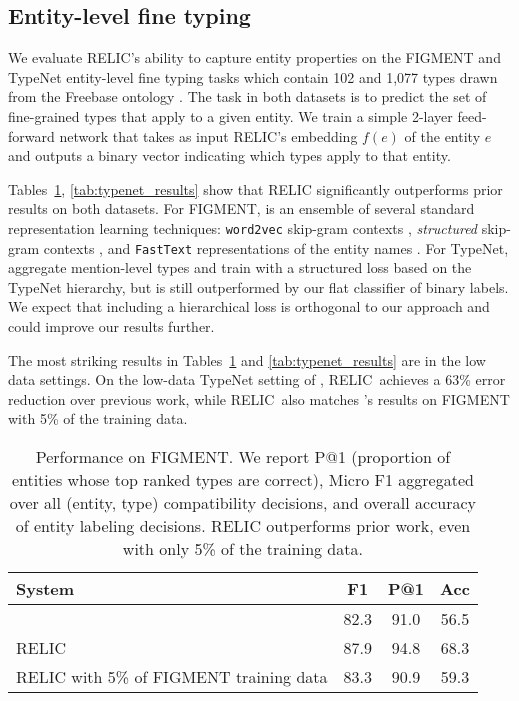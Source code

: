 \documentclass{article} \usepackage{iclr2020_conference,times}
\newcommand{\ack}{RELIC\xspace}
\begin{document}
\subsection{Entity-level fine typing} \label{sec:entity_typing_results}


We evaluate \ack's ability to capture entity properties on the FIGMENT \citep{yaghoobzadeh2015corpus} and TypeNet \citep{murty2018hierarchical} entity-level fine typing tasks which contain 102 and 1,077 types drawn from the Freebase ontology \citep{bollacker2008freebase}.
The task in both datasets is to predict the set of fine-grained types that apply to a given entity. We train a simple 2-layer feed-forward network that takes as input \ack's embedding $f(e)$ of the entity $e$ and outputs a binary vector indicating which types apply to that entity.

Tables~\ref{tab:figment_results}, \ref{tab:typenet_results} show that \ack significantly outperforms prior results on both datasets.
For FIGMENT, \citet{yaghoobzadeh2018corpus} is an ensemble of several standard representation learning techniques: \texttt{word2vec} skip-gram contexts \citep{mikolov2013distributed}, \emph{structured} skip-gram contexts \citep{ling2015two}, and \texttt{FastText} representations of the entity names \citep{bojanowski2017enriching}.
For TypeNet, \citet{murty2018hierarchical} aggregate mention-level types and train with a structured loss based on the TypeNet hierarchy, but is still outperformed by our flat classifier of binary labels. We expect that including a hierarchical loss is orthogonal to our approach and could improve our results further.

The most striking results in Tables~\ref{tab:figment_results} and \ref{tab:typenet_results} are in the low data settings. 
On the low-data TypeNet setting of \citet{murty2018hierarchical}, \ack~achieves a 63\% error reduction over previous work, while \ack~also matches \citealt{yaghoobzadeh2018corpus}'s results on FIGMENT with 5\% of the training data.
\begin{table}[]
    \centering
    \begin{tabular}{|l|c|c|c|}
    \hline
        System & F1 & P@1 & Acc \\ \hline
        \citealt{yaghoobzadeh2018corpus} &  82.3 & 91.0 & 56.5 \\
        \ack & 87.9 & 94.8 & 68.3 \\
        \ack with 5\% of FIGMENT training data & 83.3 & 90.9 & 59.3 \\ \hline
    \end{tabular}
    \caption{Performance on FIGMENT. We report P@1 (proportion of entities whose top ranked types are correct), Micro F1 aggregated over all (entity, type) compatibility decisions, and overall accuracy of entity labeling decisions. \ack outperforms prior work, even with only 5\% of the training data.}
    \label{tab:figment_results}
\end{table}
\end{document}
